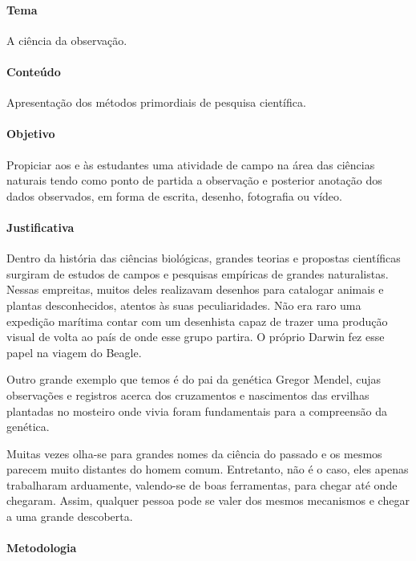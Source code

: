 \documentclass[11pt]{extarticle}
\begin{document}
\paragraph{Tema} A ciência da observação. 

\paragraph{Conteúdo} Apresentação dos métodos primordiais de pesquisa
científica.

\paragraph{Objetivo} Propiciar aos e às estudantes uma atividade de campo
na área das ciências naturais tendo como ponto de partida a observação
e posterior anotação dos dados observados, em forma de escrita, desenho,
fotografia ou vídeo. 

\paragraph{Justificativa} Dentro da história das ciências biológicas, grandes teorias e propostas
científicas surgiram de estudos de campos e pesquisas empíricas de grandes
naturalistas. Nessas empreitas, muitos deles realizavam desenhos para catalogar
animais e plantas desconhecidos, atentos às suas peculiaridades. Não era raro
uma expedição marítima contar com um desenhista capaz de trazer uma produção
visual de volta ao país de onde esse grupo partira. O próprio Darwin fez esse
papel na viagem do Beagle.

Outro grande exemplo que temos é do pai da genética Gregor Mendel, cujas
observações e registros acerca dos cruzamentos e nascimentos das ervilhas
plantadas no mosteiro onde vivia foram fundamentais para a compreensão da
genética.

Muitas vezes olha-se para grandes nomes da ciência do passado e os mesmos
parecem muito distantes do homem comum. Entretanto, não é o caso, eles apenas
trabalharam arduamente, valendo-se de boas ferramentas, para chegar até onde
chegaram. Assim, qualquer pessoa pode se valer dos mesmos mecanismos e chegar
a uma grande descoberta.

\paragraph{Metodologia}
\end{document}
